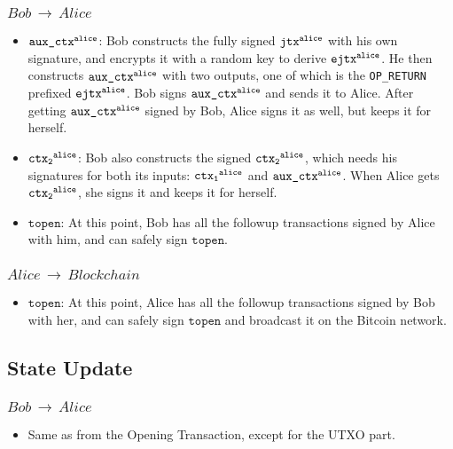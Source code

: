 \subsubsection{$Bob\,\to\,Alice$}
\begin{itemize}[leftmargin=4\parindent]
    \item $\texttt{aux\_ctx\textsuperscript{alice}}$: Bob constructs the fully signed $\texttt{jtx\textsuperscript{alice}}$ with his own signature, and encrypts it with a random key to derive $\texttt{ejtx\textsuperscript{alice}}$. He then constructs $\texttt{aux\_ctx\textsuperscript{alice}}$ with two outputs, one of which is the \texttt{OP\_RETURN} prefixed $\texttt{ejtx\textsuperscript{alice}}$. Bob signs $\texttt{aux\_ctx\textsuperscript{alice}}$ and sends it to Alice. After getting $\texttt{aux\_ctx\textsuperscript{alice}}$ signed by Bob, Alice signs it as well, but keeps it for herself.
    \item $\texttt{ctx\textsubscript{2}\textsuperscript{alice}}$: Bob also constructs the signed $\texttt{ctx\textsubscript{2}\textsuperscript{alice}}$, which needs his signatures for both its inputs: $\texttt{ctx\textsubscript{1}\textsuperscript{alice}}$ and $\texttt{aux\_ctx\textsuperscript{alice}}$. When Alice gets $\texttt{ctx\textsubscript{2}\textsuperscript{alice}}$, she signs it and keeps it for herself.     
    \item $\texttt{topen}$: At this point, Bob has all the followup transactions signed by Alice with him, and can safely sign $\texttt{topen}$.
\end{itemize}
\subsubsection{$Alice\,\to\,Blockchain$}
\begin{itemize}[leftmargin=4\parindent]
    \item $\texttt{topen}$: At this point, Alice has all the followup transactions signed by Bob with her, and can safely sign $\texttt{topen}$ and broadcast it on the Bitcoin network.
\end{itemize}

\subsection{State Update}
\subsubsection{$Bob\,\to\,Alice$}
\begin{itemize}[leftmargin=4\parindent]
    \item Same as from the Opening Transaction, except for the UTXO part.
\end{itemize}
